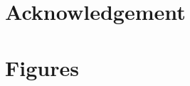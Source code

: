 \documentclass[12pt,doublespacing,a4paper]{ouparticle}
\begin{document}

\section{Acknowledgement}


\clearpage
%
%


\clearpage
\section{Figures}
\end{document}
